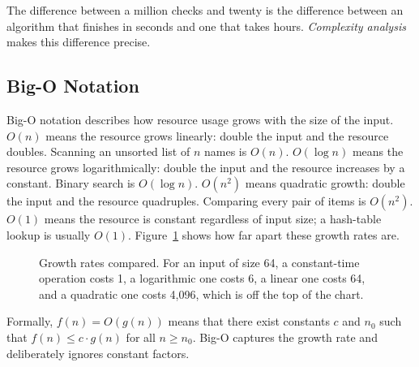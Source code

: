 \documentclass[11pt]{book}
\begin{document}
The difference between a million checks and twenty is the difference between an algorithm that finishes in seconds and one that takes hours. \emph{Complexity analysis} makes this difference precise.

\subsection{Big-O Notation}

Big-O notation describes how resource usage grows with the size of the input. $O(n)$ means the resource grows linearly: double the input and the resource doubles. Scanning an unsorted list of $n$ names is $O(n)$. $O(\log n)$ means the resource grows logarithmically: double the input and the resource increases by a constant. Binary search is $O(\log n)$. $O(n^2)$ means quadratic growth: double the input and the resource quadruples. Comparing every pair of items is $O(n^2)$. $O(1)$ means the resource is constant regardless of input size; a hash-table lookup is usually $O(1)$. Figure~\ref{fig:bigo} shows how far apart these growth rates are.

\begin{figure}[htbp]
\centering
{}
\caption{Growth rates compared. For an input of size 64, a constant-time operation costs 1, a logarithmic one costs 6, a linear one costs 64, and a quadratic one costs 4{,}096, which is off the top of the chart.}
\label{fig:bigo}
\end{figure}

Formally, $f(n) = O(g(n))$ means that there exist constants $c$ and $n_0$ such that $f(n) \leq c \cdot g(n)$ for all $n \geq n_0$. Big-O captures the growth rate and deliberately ignores constant factors.
\end{document}
